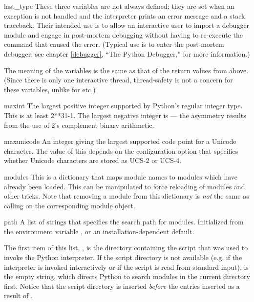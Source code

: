 \begin{datadesc}{last_type}
  These three variables are not always defined; they are set when an
  exception is not handled and the interpreter prints an error message
  and a stack traceback.  Their intended use is to allow an
  interactive user to import a debugger module and engage in
  post-mortem debugging without having to re-execute the command that
  caused the error.  (Typical use is  to
  enter the post-mortem debugger; see chapter \ref{debugger}, ``The
  Python Debugger,'' for more information.)

  The meaning of the variables is the same as that of the return
  values from  above.  (Since there is only one
  interactive thread, thread-safety is not a concern for these
  variables, unlike for  etc.)
\end{datadesc}

\begin{datadesc}{maxint}
  The largest positive integer supported by Python's regular integer
  type.  This is at least 2**31-1.  The largest negative integer is
   --- the asymmetry results from the use of 2's
  complement binary arithmetic.
\end{datadesc}

\begin{datadesc}{maxunicode}
  An integer giving the largest supported code point for a Unicode
  character.  The value of this depends on the configuration option
  that specifies whether Unicode characters are stored as UCS-2 or
  UCS-4.
\end{datadesc}

\begin{datadesc}{modules}
  This is a dictionary that maps module names to modules which have
  already been loaded.  This can be manipulated to force reloading of
  modules and other tricks.  Note that removing a module from this
  dictionary is \emph{not} the same as calling
   on the corresponding module
  object.
\end{datadesc}

\begin{datadesc}{path}
  A list of strings that specifies the search path for modules.
  Initialized from the environment variable , or an
  installation-dependent default.

  The first item of this list, , is the directory
  containing the script that was used to invoke the Python
  interpreter.  If the script directory is not available (e.g.  if the
  interpreter is invoked interactively or if the script is read from
  standard input),  is the empty string, which directs
  Python to search modules in the current directory first.  Notice
  that the script directory is inserted \emph{before} the entries
  inserted as a result of .
\end{datadesc}

